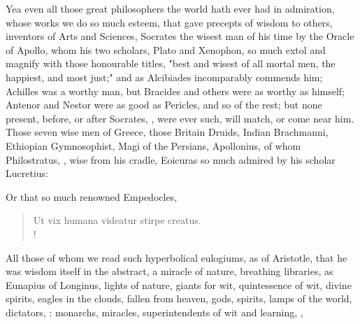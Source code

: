 Yea even all those great philosophers the world hath ever had in admiration,
whose works we do so much esteem, that gave precepts of wisdom to others,
inventors of Arts and Sciences, Socrates the wisest man of his time by the
Oracle of Apollo, whom his two scholars, Plato and
Xenophon, so much extol and magnify with those honourable
titles, "best and wisest of all mortal men, the happiest, and most just;" and
as Alcibiades incomparably commends him; Achilles was a
worthy man, but Bracides and others were as worthy as himself; Antenor and
Nestor were as good as Pericles, and so of the rest; but none present, before,
or after Socrates, , were ever such,
will match, or come near him. Those seven wise men of Greece, those Britain
Druids, Indian Brachmanni, Ethiopian Gymnosophist, Magi of the Persians,
Apollonius, of whom Philostratus, , wise from
his cradle, Eoicuras so much admired by his scholar Lucretius:


Or that so much renowned Empedocles,

\begin{latin}
\begin{verse}%
Ut vix humana videatur stirpe creatus.\\!
\end{verse}%
\end{latin}

All those of whom we read such hyperbolical eulogiums, as
of Aristotle, that he was wisdom itself in the abstract, a
miracle of nature, breathing libraries, as Eunapius of Longinus, lights of
nature, giants for wit, quintessence of wit, divine spirits, eagles in the
clouds, fallen from heaven, gods, spirits, lamps of the world, dictators,
: monarchs, miracles,
superintendents of wit and learning, ,

